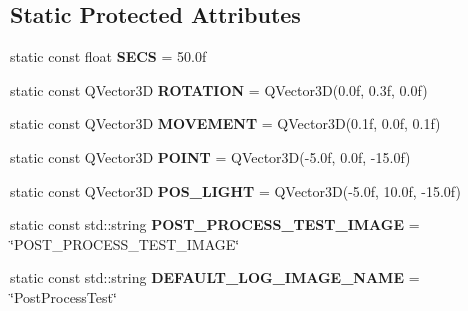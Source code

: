 \subsection*{Static Protected Attributes}
\begin{DoxyCompactItemize}
\item 
\mbox{\label{class_unit_test_1_1_c_post_process_test_acff8e621a7a04200d6712abfe11da94e}} 
static const float {\bfseries S\+E\+CS} = 50.\+0f
\item 
\mbox{\label{class_unit_test_1_1_c_post_process_test_aa0d78cc64f6a21d231703f6c299f62ea}} 
static const Q\+Vector3D {\bfseries R\+O\+T\+A\+T\+I\+ON} = Q\+Vector3D(0.\+0f, 0.\+3f, 0.\+0f)
\item 
\mbox{\label{class_unit_test_1_1_c_post_process_test_ab46e953eea257dea451351b8d44297de}} 
static const Q\+Vector3D {\bfseries M\+O\+V\+E\+M\+E\+NT} = Q\+Vector3D(0.\+1f, 0.\+0f, 0.\+1f)
\item 
\mbox{\label{class_unit_test_1_1_c_post_process_test_a157ce0026e7773bf2654071cb4280b95}} 
static const Q\+Vector3D {\bfseries P\+O\+I\+NT} = Q\+Vector3D(-\/5.\+0f, 0.\+0f, -\/15.\+0f)
\item 
\mbox{\label{class_unit_test_1_1_c_post_process_test_a1485a88f65e1ee211f98ab867dd33721}} 
static const Q\+Vector3D {\bfseries P\+O\+S\+\_\+\+L\+I\+G\+HT} = Q\+Vector3D(-\/5.\+0f, 10.\+0f, -\/15.\+0f)
\item 
\mbox{\label{class_unit_test_1_1_c_post_process_test_a8a34ea78de03c8985d7ef1119a18ecdc}} 
static const std\+::string {\bfseries P\+O\+S\+T\+\_\+\+P\+R\+O\+C\+E\+S\+S\+\_\+\+T\+E\+S\+T\+\_\+\+I\+M\+A\+GE} = \char`\"{}P\+O\+S\+T\+\_\+\+P\+R\+O\+C\+E\+S\+S\+\_\+\+T\+E\+S\+T\+\_\+\+I\+M\+A\+GE\char`\"{}
\item 
\mbox{\label{class_unit_test_1_1_c_post_process_test_ab46ac12dc7a94439ab9d952906c49e4c}} 
static const std\+::string {\bfseries D\+E\+F\+A\+U\+L\+T\+\_\+\+L\+O\+G\+\_\+\+I\+M\+A\+G\+E\+\_\+\+N\+A\+ME} = \char`\"{}Post\+Process\+Test\char`\"{}
\end{DoxyCompactItemize}


